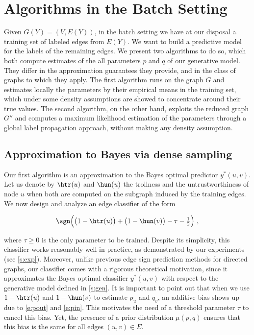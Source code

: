 \section{Algorithms in the Batch Setting}\label{s:algbatch}

Given $G(Y) =(V,E(Y))$, in the batch setting we have at our disposal a training set \trainset{} of
labeled edges from $E(Y)$. We want to build a predictive model for the labels of the remaining
edges. We present two algorithms to do so, which both compute estimates of the all parameters $p$
and $q$ of our generative model. They differ in the approximation guarantees they provide, and in
the class of graphs to which they apply. The first algorithm runs on the graph $G$ and estimates
locally the parameters by their empirical means in the training set, which under some density
assumptions are showed to concentrate around their true values. The second algorithm, on the other
hand, exploits the reduced graph $G''$ and computes a maximum likelihood estimation of the
parameters through a global label propagation approach, without making any density assumption.

\subsection{Approximation to Bayes via dense sampling}\label{ss:bayes_approx}

Our first algorithm is an approximation to the Bayes optimal predictor $y^*(u,v)$. Let us denote by
$\htr(u)$ and $\hun(u)$ the trollness and the untrustworthiness of node $u$ when both are computed
on the subgraph induced by the training edges. We now design and analyze an edge classifier of the
form

\begin{equation}
  \label{eq:predictor}
  \sgn\Big(\big(1-\htr(u)\big) + \big(1-\hun(v)\big) -\tau - \tfrac{1}{2}\Big)~,
\end{equation}

where $\tau \ge 0$ is the only parameter to be trained. Despite its simplicity, this classifier
works reasonably well in practice, as demonstrated by our experiments (see \autoref{s:exp}).
Moreover, unlike previous edge sign prediction methods for directed graphs, our classifier comes
with a rigorous theoretical motivation, since it approximates the Bayes optimal classifier
$y^*(u,v)$ with respect to the generative model defined in \autoref{s:gen}. It is important to point
out that when we use $1-\htr(u)$ and $1-\hun(v)$ to estimate $p_u$ and $q_v$, an additive bias shows
up due to \eqref{e:pout} and \eqref{e:pin}. This motivates the need of a threshold parameter $\tau$
to cancel this bias. Yet, the presence of a prior distribution $\mu(p,q)$ ensures that this bias is
the same for all edges $(u,v) \in E$.

